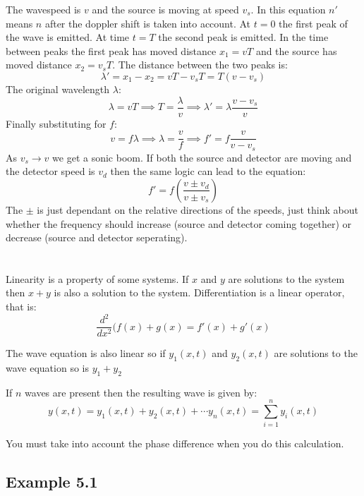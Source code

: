 \documentclass{article}
\newcommand{\diff}[2][]{\frac{d^{#1}}{d{#2}^{#1}}}
\begin{document}
The wavespeed is \(v\) and the source is moving at speed \(v_s\). In this equation \(n'\) means \(n\) after the doppler shift is taken into account. At \(t=0\) the first peak of the wave is emitted. At time \(t=T\) the second peak is emitted. In the time between peaks the first peak has moved distance \(x_1=vT\) and the source has moved distance \(x_2=v_sT\). The distance between the two peaks is:
\[\lambda'=x_1-x_2=vT-v_sT=T(v-v_s)\]
The original wavelength \(\lambda\):
\[\lambda=vT\implies T=\frac{\lambda}{v}\implies\lambda'=\lambda\frac{v-v_s}{v}\]
Finally substituting for \(f\):
\[v=f\lambda\implies\lambda=\frac vf\implies f'=f\frac{v}{v-v_s}\]
As \(v_s\to v\) we get a sonic boom. If both the source and detector are moving and the detector speed is \(v_d\) then the same logic can lead to the equation:
\[f'=f\left(\frac{v\pm v_d}{v\pm v_s}\right)\]
The \(\pm\) is just dependant on the relative directions of the speeds, just think about whether the frequency should increase (source and detector coming together) or decrease (source and detector seperating).
 
\section{}

Linearity is a property of some systems. If \(x\) and \(y\) are solutions to the system then \(x+y\) is also a solution to the system. Differentiation is a linear operator, that is:
\[\diff[2] x(f(x)+g(x)=f'(x)+g'(x)\]

The wave equation is also linear so if \(y_1(x,t)\) and \(y_2(x,t)\) are solutions to the wave equation so is \(y_1+y_2\)

If \(n\) waves are present then the resulting wave is given by:
\[y(x,t)=y_1(x,t)+y_2(x,t)+\cdots y_n(x,t)=\sum_{i=1}^ny_i(x,t)\]

You must take into account the phase difference when you do this calculation.

\subsection*{Example 5.1}
\end{document}
